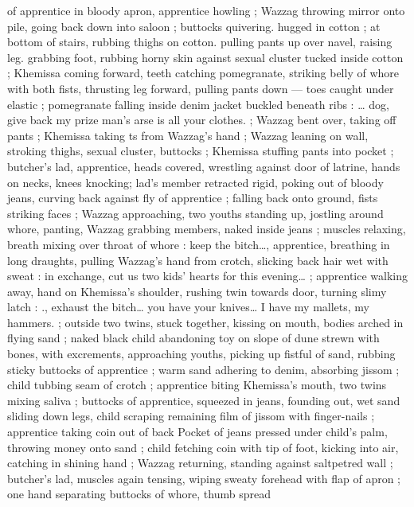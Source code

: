 {of apprentice in bloody apron, apprentice howling ; Wazzag throwing 
mirror onto pile, going back down into saloon ; buttocks quivering. 
hugged in cotton ; at bottom of stairs, rubbing thighs on cotton. 
pulling pants up over navel, raising leg. grabbing foot, rubbing horny 
skin against sexual cluster tucked inside cotton ; Khemissa coming 
forward, teeth catching pomegranate, striking belly of whore with 
both fists, thrusting leg forward, pulling pants down --- toes caught 
under elastic ; pomegranate falling inside denim jacket buckled 
beneath ribs : {\gl}{\ldots} dog, give back my prize{\td} man's arse is all your 
clothes.{\gr} ; Wazzag bent over, taking off pants ; Khemissa taking 
ts from Wazzag's hand ; Wazzag leaning on wall, stroking thighs, 
sexual cluster, buttocks ; Khemissa stuffing pants into pocket ; 
butcher's lad, apprentice, heads covered, wrestling against door of 
latrine, hands on necks, knees knocking; lad's member retracted 
rigid, poking out of bloody jeans, curving back against fly of 
apprentice ; falling back onto ground, fists striking faces ; Wazzag 
approaching, two youths standing up, jostling around whore, panting, 
Wazzag grabbing members, naked inside jeans ; muscles relaxing, 
breath mixing over throat of whore : {\gl} keep the bitch{\ldots}{\gr}, apprentice, 
breathing in long draughts, pulling Wazzag's hand from crotch, 
slicking back hair wet with sweat : {\gl}{\td} in exchange, cut us two kids' 
hearts for this evening{\ldots}{\gr} ; apprentice walking away, hand on 
Khemissa's shoulder, rushing twin towards door, turning slimy latch : 
{\gl}., exhaust the bitch{\ldots} you have your knives{\ldots} I have my mallets, my 
hammers.{\gr} ; outside {\td} two twins, stuck together, kissing on mouth, 
bodies arched in flying sand ; naked black child abandoning toy on 
slope of dune strewn with bones, with excrements, approaching 
youths, picking up fistful of sand, rubbing sticky buttocks of 
apprentice ; warm sand adhering to denim, absorbing jissom ; child 
tubbing seam of crotch ; apprentice biting Khemissa's mouth, two 
twins mixing saliva ; buttocks of apprentice, squeezed in jeans, 
founding out, wet sand sliding down legs, child scraping remaining 
film of jissom with finger-nails ; apprentice taking coin out of back 
Pocket of jeans pressed under child's palm, throwing money onto 
sand ; child fetching coin with tip of foot, kicking into air, catching in 
shining hand ; Wazzag returning, standing against saltpetred wall ; 
butcher's lad, muscles again tensing, wiping sweaty forehead with 
flap of apron ; one hand separating buttocks of whore, thumb spread 
}
